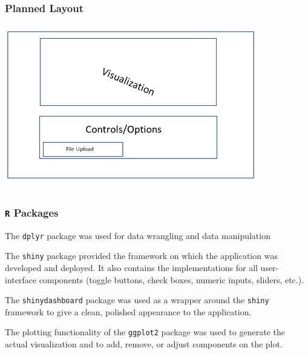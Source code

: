 \documentclass[handout, xcolor=dvipsnames]{beamer}
\begin{document}
\begin{frame}
	\frametitle{Planned Layout}
	\begin{center}
	\includegraphics[height=7cm,width=11cm]{figures/proto_app_layout.png}
	\end{center}	
\end{frame}

\subsection{}
\begin{frame}
	\frametitle{{\tt R} Packages}
	\begin{description}[labelwidth=4em]

\item[{\bf dplyr:}] {\footnotesize The {\tt dplyr} package \citep{DPLYR} was used for data wrangling and data manipulation}

\item[{\bf shiny:}] {\footnotesize The {\tt shiny} package \citep{SHINY} provided the framework on which the application was developed and deployed. It also contains the implementations for all user-interface components (toggle buttons, check boxes, numeric inputs, sliders, etc.).}

\item[{\bf shinydashboard:}] {\footnotesize The {\tt shinydashboard} package \citep{DASH} was used as a wrapper around the {\tt shiny} framework to give a clean, polished appearance to the application.}

\item[{\bf ggplot2:}] {\footnotesize The plotting functionality of the {\tt ggplot2} package \citep{GGPLOT} was used to generate the actual visualization and to add, remove, or adjust components on the plot.}

\end{description}
\end{frame}
\end{document}

